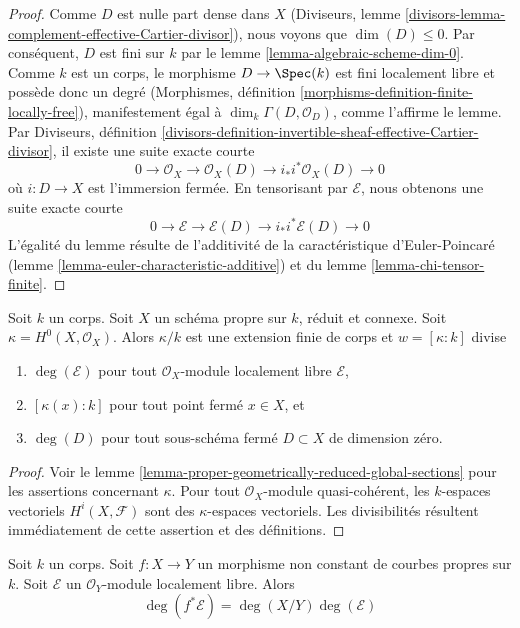 \begin{proof}
Comme $D$ est nulle part dense dans $X$ (Diviseurs, lemme
\ref{divisors-lemma-complement-effective-Cartier-divisor}),
nous voyons que $\dim(D) \leq 0$. Par conséquent, $D$ est fini sur $k$
par le lemme \ref{lemma-algebraic-scheme-dim-0}. Comme $k$ est un corps,
le morphisme $D \to \Spec(k)$ est fini localement libre et possède donc
un degré
(Morphismes, définition \ref{morphisms-definition-finite-locally-free}),
manifestement égal à $\dim_k \Gamma(D, \mathcal{O}_D)$,
comme l'affirme le lemme. Par
Diviseurs, définition
\ref{divisors-definition-invertible-sheaf-effective-Cartier-divisor},
il existe une suite exacte courte
$$
0 \to \mathcal{O}_X \to \mathcal{O}_X(D) \to i_*i^*\mathcal{O}_X(D) \to 0
$$
où $i : D \to X$ est l'immersion fermée. En tensorisant par $\mathcal{E}$,
nous obtenons une suite exacte courte
$$
0 \to \mathcal{E} \to \mathcal{E}(D) \to i_*i^*\mathcal{E}(D) \to 0
$$
L'égalité du lemme résulte de l'additivité de
la caractéristique d'Euler-Poincaré (lemme \ref{lemma-euler-characteristic-additive})
et du lemme \ref{lemma-chi-tensor-finite}.
\end{proof}

\begin{lemma}
\label{lemma-divisible}
Soit $k$ un corps. Soit $X$ un schéma propre sur $k$,
réduit et connexe.
Soit $\kappa = H^0(X, \mathcal{O}_X)$. Alors $\kappa/k$ est une
extension finie de corps et $w = [\kappa : k]$ divise
\begin{enumerate}
\item $\deg(\mathcal{E})$ pour tout $\mathcal{O}_X$-module localement libre
$\mathcal{E}$,
\item $[\kappa(x) : k]$ pour tout point fermé $x \in X$, et
\item $\deg(D)$ pour tout sous-schéma fermé $D \subset X$
de dimension zéro.
\end{enumerate}
\end{lemma}

\begin{proof}
Voir le lemme \ref{lemma-proper-geometrically-reduced-global-sections}
pour les assertions concernant $\kappa$.
Pour tout $\mathcal{O}_X$-module quasi-cohérent, les
$k$-espaces vectoriels $H^i(X, \mathcal{F})$ sont des $\kappa$-espaces vectoriels.
Les divisibilités résultent immédiatement de cette assertion et des
définitions.
\end{proof}

\begin{lemma}
\label{lemma-degree-pullback-map-proper-curves}
Soit $k$ un corps. Soit $f : X \to Y$ un morphisme non constant de
courbes propres sur $k$. Soit $\mathcal{E}$ un
$\mathcal{O}_Y$-module localement libre. Alors
$$
\deg(f^*\mathcal{E}) = \deg(X/Y) \deg(\mathcal{E})
$$
\end{lemma}

